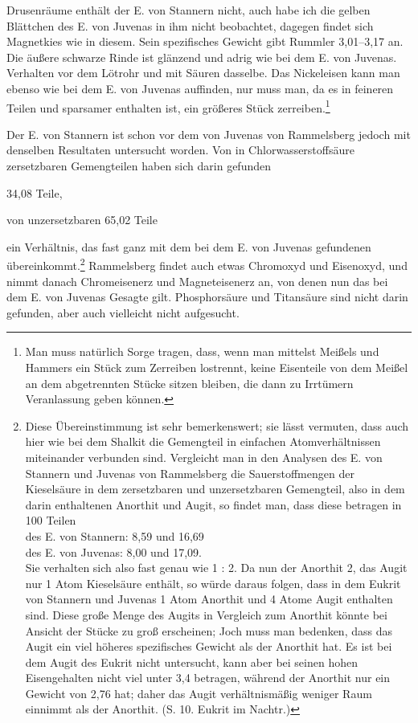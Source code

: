 \documentclass[a4paper, 11pt, oneside]{article}
\begin{document}
Drusenräume enthält der E. von Stannern nicht, auch habe ich die gelben Blättchen des E. von Juvenas in ihm nicht beobachtet, dagegen findet sich Magnetkies wie in diesem. Sein spezifisches Gewicht gibt Rummler 3,01--3,17 an. Die äußere schwarze Rinde ist glänzend und adrig wie bei dem E. von Juvenas. Verhalten vor dem Lötrohr und mit Säuren dasselbe. Das Nickeleisen kann man ebenso wie bei dem E. von Juvenas auffinden, nur muss man, da es in feineren Teilen und sparsamer enthalten ist, ein größeres Stück zerreiben.\footnote{Man muss natürlich Sorge tragen, dass, wenn man mittelst Meißels und Hammers ein Stück zum Zerreiben lostrennt, keine Eisenteile von dem Meißel an dem abgetrennten Stücke sitzen bleiben, die dann zu Irrtümern Veranlassung geben können.}

Der E. von Stannern ist schon vor dem von Juvenas von Rammelsberg jedoch mit denselben Resultaten untersucht worden. Von in Chlorwasserstoffsäure zersetzbaren Gemengteilen haben sich darin gefunden
\begin{center}
34,08 Teile,
\end{center}
\begin{center}
von unzersetzbaren 65,02 Teile
\end{center}
ein Verhältnis, das fast ganz mit dem bei dem E. von Juvenas gefundenen übereinkommt.\footnote{Diese Übereinstimmung ist sehr bemerkenswert; sie lässt vermuten, dass auch hier wie bei dem Shalkit die Gemengteil in einfachen Atomverhältnissen miteinander verbunden sind. Vergleicht man in den Analysen des E. von Stannern und Juvenas von Rammelsberg die Sauerstoffmengen der Kieselsäure in dem zersetzbaren und unzersetzbaren Gemengteil, also in dem darin enthaltenen Anorthit und Augit, so findet man, dass diese betragen in 100 Teilen\\
des E. von Stannern: 8,59 und 16,69\\
des E. von Juvenas: 8,00 und 17,09.\\
Sie verhalten sich also fast genau wie 1 : 2. Da nun der Anorthit 2, das Augit nur 1 Atom Kieselsäure enthält, so würde daraus folgen, dass in dem Eukrit von Stannern und Juvenas 1 Atom Anorthit und 4 Atome Augit enthalten sind. Diese große Menge des Augits in Vergleich zum Anorthit könnte bei Ansicht der Stücke zu groß erscheinen; Joch muss man bedenken, dass das Augit ein viel höheres spezifisches Gewicht als der Anorthit hat. Es ist bei dem Augit des Eukrit nicht untersucht, kann aber bei seinen hohen Eisengehalten nicht viel unter 3,4 betragen, während der Anorthit nur ein Gewicht von 2,76 hat; daher das Augit verhältnismäßig weniger Raum einnimmt als der Anorthit. (S. 10. Eukrit im Nachtr.)} Rammelsberg findet auch etwas Chromoxyd und Eisenoxyd, und nimmt danach Chromeisenerz und Magneteisenerz an, von denen nun das bei dem E. von Juvenas Gesagte gilt. Phosphorsäure und Titansäure sind nicht darin gefunden, aber auch vielleicht nicht aufgesucht.
\end{document}

